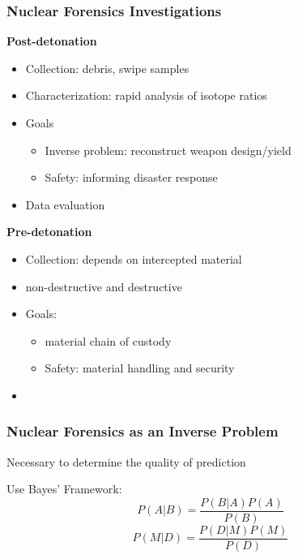 
\begin{frame}
  \frametitle{Nuclear Forensics Investigations}
  \begin{minipage}[t]{0.5\textwidth}
    \textbf{Post-detonation}
    \begin{itemize}
      \item Collection: debris, swipe samples
      \item Characterization: rapid analysis of isotope ratios
      \item Goals
      \begin{itemize}
        \item Inverse problem: reconstruct weapon design/yield
        \item Safety: informing disaster response
      \end{itemize}
      \item Data evaluation
    \end{itemize}
  \end{minipage}%
  \pause
  \begin{minipage}[t]{0.5\textwidth}
    \textbf{Pre-detonation}
    \begin{itemize}
      \item Collection: depends on intercepted material
      \item {} non-destructive and destructive
      \item Goals:
      \begin{itemize}
        \item {} material chain of custody
        \item Safety: material handling and security
      \end{itemize}
      \item {}
    \end{itemize}
  \end{minipage}
\end{frame}


\begin{frame}
  \frametitle{Nuclear Forensics as an Inverse Problem}
  Necessary to determine the quality of prediction

  Use Bayes' Framework:
  $$ P(A|B) = \frac{P(B|A)P(A)}{P(B)} $$
  $$ P(M|D) = \frac{P(D|M)P(M)}{P(D)} $$
\end{frame}

